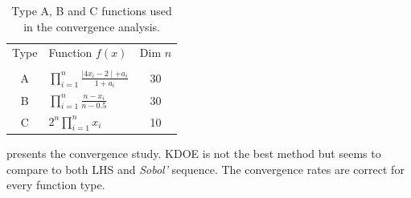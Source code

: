 \begin{table}[!h]
\centering
\caption{Type A, B and C functions used in the convergence analysis.}
\begin{tabular}{clc}
\toprule
Type &  Function $f(x)$ & Dim $n$\\
 &   &  \\
\midrule %
A & $\displaystyle\prod_{i=1}^n \frac{\mid 4x_i - 2 \mid + a_i}{1 + a_i}$& 30\\
B & $\displaystyle\prod_{i=1}^n \frac{n-x_i}{n-0.5}$ & 30\\
C & $2^n \displaystyle\prod_{i=1}^n x_i$ & 10\\
\bottomrule
\end{tabular}
\label{tab:conv_int}
\end{table}


 presents the convergence study. KDOE is not the best method but seems to compare to both LHS and \emph{Sobol'} sequence. The convergence rates are correct for every function type.


